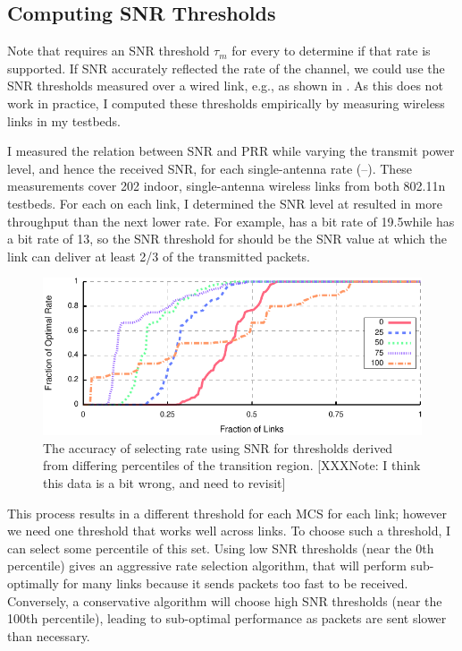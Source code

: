 \subsection{Computing SNR Thresholds}
Note that  requires an SNR threshold $\tau_m$ for every  to determine if that rate is supported. If SNR accurately reflected the rate of the channel, we could use the SNR thresholds measured over a wired link, e.g., as shown in . As this does not work in practice, I computed these thresholds empirically by measuring wireless links in my testbeds.

I measured the relation between SNR and PRR while varying the transmit power level, and hence the received SNR, for each single-antenna rate (--). These measurements cover 202 indoor, single-antenna wireless links from both 802.11n testbeds.
For each  on each link, I determined the SNR level at  resulted in more throughput than the next lower rate. For example,  has a bit rate of 19.5\Mbps while  has a bit rate of 13\Mbps, so the SNR threshold for  should be the SNR value at which the link can deliver at least 2/3 of the transmitted packets.

\begin{figure}[ht]
	\centering
	\includegraphics[width=\textwidth]{figures/thresh_vs_opt.pdf}
	\caption[The accuracy of selecting rate using SNR for thresholds derived from differing percentiles of the transition region.]{\label{fig:thresh_vs_opt}The accuracy of selecting rate using SNR for thresholds derived from differing percentiles of the transition region. [XXXNote: I think this data is a bit wrong, and need to revisit]}
\end{figure}

This process results in a different threshold for each MCS for each link; however we need one threshold that works well across links. To choose such a threshold, I can select some percentile of this set. Using low SNR thresholds (near the 0th percentile) gives an aggressive rate selection algorithm, that will perform sub-optimally for many links because it sends packets too fast to be received. Conversely, a conservative algorithm will choose high SNR thresholds (near the 100th percentile), leading to sub-optimal performance as packets are sent slower than necessary.

